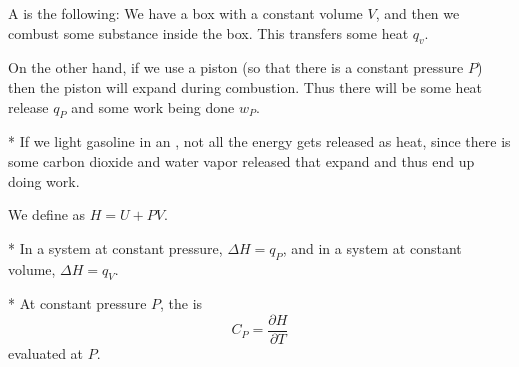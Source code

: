 A  is the following: 
We have a box with a constant volume $V$, and then we combust some substance inside the box. This transfers some heat $q_v$.

On the other hand, if we use a piston (so that there is a constant pressure $P$) then the piston will expand during combustion. 
Thus there will be some heat release $q_P$ and some work being done $w_P$.

\begin{exm}*
	If we light gasoline in an , not all the energy gets released as heat, since there is some carbon dioxide and water vapor released that expand and thus end up doing work.
\end{exm}

\begin{defn}
	We define  as $H = U + PV$.
\end{defn}

\begin{fact}*
	In a system at constant pressure, $\Delta H = q_P$, and in a system at constant volume, $\Delta H = q_V$.
\end{fact}

\begin{defn}*
	At constant pressure $P$, the  is \[
		C_P = \frac{\partial H}{\partial T}
	\]evaluated at $P$.
\end{defn}



